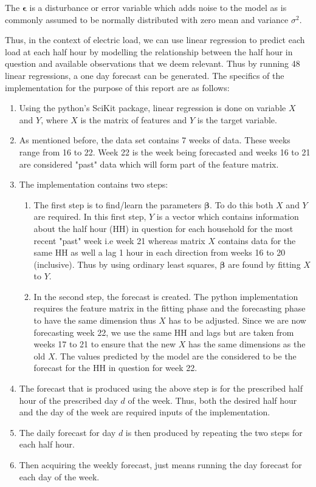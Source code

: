 \documentclass[a4paper]{article}
\begin{document}
The $\boldsymbol \epsilon$ is a disturbance or error variable which adds noise to the model as is commonly assumed to be normally distributed with zero mean and variance $\sigma^2$.

Thus, in the context of electric load, we can use linear regression to predict each load at each half hour by modelling the relationship between the half hour in question and available observations that we deem relevant. Thus by running 48 linear regressions, a one day forecast can be generated. The specifics of the implementation for the purpose of this report are as follows:
\begin{enumerate}
\item Using the python's SciKit package, linear regression is done on variable $X$ and $Y$, where $X$ is the matrix of features and $Y$ is the target variable.
\item As mentioned before, the data set contains 7 weeks of data. These weeks range from 16 to 22. Week 22 is the week being forecasted and weeks 16 to 21 are considered "past" data which will form part of the feature matrix. 
\item The implementation contains two steps: \begin{enumerate} \item The first step is to find/learn the parameters $\boldsymbol \beta$. To do this both $X$ and $Y$ are required. In this first step, $Y$ is a vector which contains information about the half hour (HH) in question for each household for the most recent "past" week i.e week 21 whereas matrix $X$ contains data for the same HH as well a lag 1 hour in each direction from weeks 16 to 20 (inclusive). Thus by using ordinary least squares, $\boldsymbol \beta$ are found by fitting $X$ to $Y$.
\item In the second step, the forecast is created. The python implementation requires the feature matrix in the fitting phase and the forecasting phase to have the same dimension thus $X$ has to be adjusted. Since we are now forecasting week 22, we use the same HH and lags but are taken from weeks 17 to 21 to ensure that the new $X$ has the same dimensions as the old $X$. The values predicted by the model are the considered to be the forecast for the HH in question for week 22. \end{enumerate}
\item The forecast that is produced using the above step is for the prescribed half hour of the prescribed day $d$ of the week. Thus, both the desired half hour and the day of the week are required inputs of the implementation.
\item The daily forecast for day $d$ is then produced by repeating the two steps for each half hour.
\item Then acquiring the weekly forecast, just means running the day forecast for each day of the week.
\end{enumerate}
\end{document}
